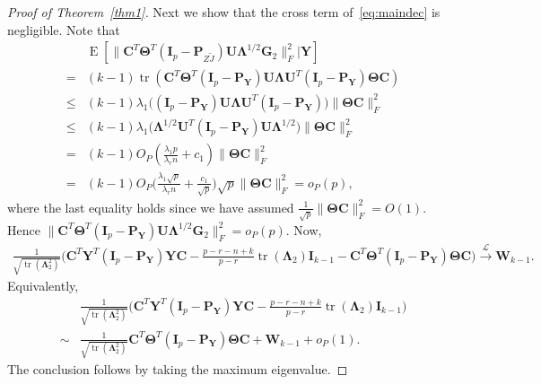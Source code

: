 \documentclass[12pt]{article} %
\DeclareMathOperator{\mytr}{tr}
\DeclareMathOperator{\myE}{E}
\newcommand{\bP}{\mathbf{P}}
\newcommand{\bY}{\mathbf{Y}}
\newcommand{\bG}{\mathbf{G}}
\newcommand{\bC}{\mathbf{C}}
\newcommand{\bI}{\mathbf{I}}
\newcommand{\bU}{\mathbf{U}}
\newcommand{\bW}{\mathbf{W}}
\newcommand{\bfsym}[1]{\ensuremath{\boldsymbol{#1}}}
\def\bLambda {\bfsym {\Lambda}}
\def\bTheta {\bfsym {\Theta}}
\theoremstyle{definition}
\begin{document}
\begin{appendices}
\begin{proof}[\textrm{Proof of Theorem~\ref{thm1}}]
Next we show that the cross term of~\eqref{eq:maindec} is negligible. Note that
$$
\begin{aligned}
    &\myE [\|\bC^T \bTheta^T (\bI_p -\bP_{Z\tilde{J}})\bU\bLambda^{1/2}\bG_2\|_F^2|\bY]\\
    = &
    (k-1)\mytr(\bC^T \bTheta^T (\bI_p -\bP_{\bY})\bU\bLambda \bU^T (\bI_p -\bP_{\bY})\bTheta \bC)\\
    \leq &
    (k-1)\lambda_1\big((\bI_p -\bP_{\bY})\bU\bLambda \bU^T (\bI_p -\bP_{\bY})\big)\|\bTheta \bC\|^2_F\\
    \leq &
    (k-1)\lambda_1\big(\bLambda^{1/2} \bU^T (\bI_p -\bP_{\bY})\bU \bLambda^{1/2}\big)\|\bTheta \bC\|^2_F\\
    = &
    (k-1) O_P(\frac{\lambda_1 p}{\lambda_r n}+c_1)  \|\bTheta \bC\|^2_F\\
    = &
    (k-1) O_P\big(\frac{\lambda_1 \sqrt{p}}{\lambda_r n}+\frac{c_1}{\sqrt{p}}\big) \sqrt{p}  \|\bTheta \bC\|^2_F=o_P(p),
\end{aligned}
$$
where the last equality holds since we have assumed $\frac{1}{\sqrt{p}}\|\bTheta \bC\|_F^2=O(1)$.
Hence $\|\bC^T \bTheta^T (\bI_p -\bP_{\bY})\bU\bLambda^{1/2}\bG_2\|_F^2=o_P(p)$. Now,
$$
\begin{aligned}
\frac{1}{\sqrt{\mytr(\bLambda_2^2)}}
    \big( \bC^T\bY^T(\bI_p-\bP_{\bY}) \bY \bC
    -\tfrac{p-r-n+k}{p-r}\mytr(\bLambda_2)\bI_{k-1} -\bC^T \bTheta^T (\bI_p-\bP_{\bY})\bTheta \bC\big)
\xrightarrow{\mathcal{L}} \bW_{k-1}.
\end{aligned}
$$
    Equivalently,
    $$
    \begin{aligned}
        &\frac{1}{\sqrt{\mytr(\bLambda_2^2)}} {\Big(\bC^T\bY^T(\bI_p-\bP_{\bY}) \bY \bC- \frac{p-r-n+k}{p-r}\mytr(\bLambda_2)\bI_{k-1}}\Big)\\
        \sim&
\frac{1}{\sqrt{\mytr(\bLambda_2^2)}} \bC^T \bTheta^T (\bI_p-\bP_{\bY})\bTheta \bC
        +\bW_{k-1}+o_P(1).
    \end{aligned}
    $$
    The conclusion follows by taking the maximum eigenvalue.
\end{proof}


\end{appendices}
\end{document}
